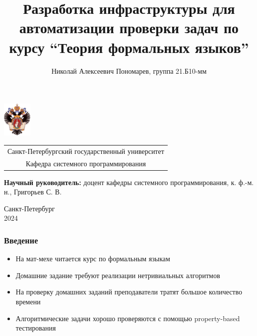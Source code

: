 \documentclass[aspectratio=169]{beamer}
\title[Инфраструктура тестирования]{Разработка инфраструктуры для автоматизации проверки задач по курсу \enquote{Теория формальных языков}}
\institute[СПбГУ]{}
\author[Николай Пономарев]{Николай Алексеевич Пономарев, группа 21.Б10-мм}
\begin{document}
{
\begin{frame}
	\includegraphics[width=1.4cm]{pictures/SPbGU_Logo.png}
	\vspace{-35pt}
	\hspace{-10pt}
	\begin{center}
		\begin{tabular}{c}
			\scriptsize{Санкт-Петербургский государственный университет} \\
			\scriptsize{Кафедра системного программирования}
		\end{tabular}
		\titlepage
	\end{center}

	\btVFill

	{\scriptsize
		\textbf{Научный руководитель:} доцент кафедры системного программирования, к. ф.-м. н., Григорьев С. В. \\
	}
	\begin{center}
		\vspace{5pt}
		\scriptsize{Санкт-Петербург\\
			2024}
	\end{center}

\end{frame}
}

\begin{frame}
	\frametitle{Введение}
	\begin{itemize}
		\item На мат-мехе читается курс по формальным языкам
		\item Домашние задание требуют реализации нетривиальных алгоритмов
		\item На проверку домашних заданий преподаватели тратят большое количество времени
		\item Алгоритмические задачи хорошо проверяются с помощью property-based тестирования
	\end{itemize}
\end{frame}
\end{document}
